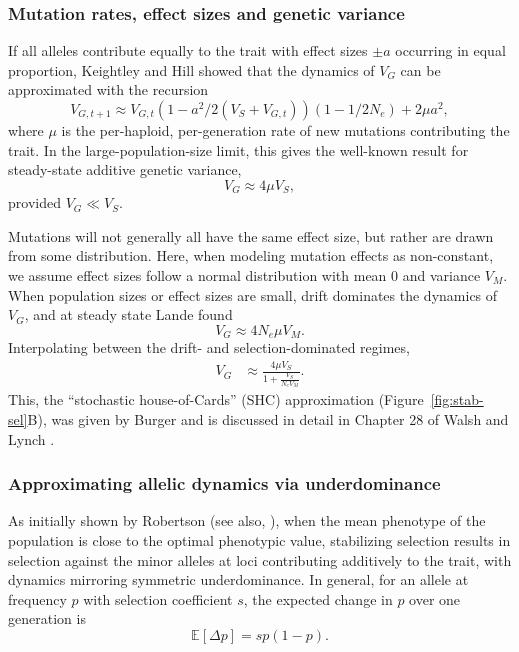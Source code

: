 \documentclass[10pt,letterpaper]{article}
\newcommand{\E}{\mathbb{E}}
\begin{document}
\subsubsection*{Mutation rates, effect sizes and genetic variance}

If all alleles contribute equally to the trait
with effect sizes \(\pm a\) occurring in equal proportion,
Keightley and Hill \cite{keightley1988quantitative} showed that the
dynamics of $V_G$ can be
approximated with the recursion
\[V_{G,t+1} \approx V_{G,t}\left(1-a^2/2(V_S+V_{G,t})\right)
\left(1-1/2N_e\right) + 2 \mu a^2,\]
where $\mu$ is the per-haploid, per-generation rate of new mutations
contributing the trait. In the
large-population-size limit, this gives the well-known result for
steady-state additive genetic variance,
\[V_G \approx 4\mu V_S,\] provided \(V_G \ll V_S\).

Mutations will not generally all have the same effect size, but rather are
drawn from some distribution. Here, when modeling mutation effects as
non-constant, we assume effect sizes follow a normal distribution with mean 0
and variance $V_M$. When population sizes or effect sizes are small, drift
dominates the dynamics of $V_G$, and at steady state Lande \cite{lande1976natural}
found \[V_G \approx 4 N_e \mu V_M.\] Interpolating between the drift- and
selection-dominated regimes,
\begin{align}\label{eq:SHC}
    V_G & \approx \frac{4 \mu V_S}{1 + \frac{V_S}{N_e V_M}}.
\end{align}
This, the ``stochastic
house-of-Cards'' (SHC) approximation (Figure~\ref{fig:stab-sel}B), was given by
Burger \cite{burger1989much} and is discussed in detail in Chapter 28 of
Walsh and Lynch \cite{walsh2018evolution}.

\subsubsection*{Approximating allelic dynamics via underdominance}

As initially shown by Robertson \cite{robertson1956effect} (see also,
\cite{keightley1988quantitative, simons2018population}), when the mean
phenotype of the population is close to the optimal phenotypic value,
stabilizing selection results in selection against the minor alleles at loci
contributing additively to the trait, with dynamics mirroring symmetric
underdominance. In general, for an allele at frequency $p$ with selection
coefficient $s$, the expected change in $p$ over one generation is
\begin{equation}
    \E[\Delta p] = sp(1-p).
\end{equation}
\end{document}
